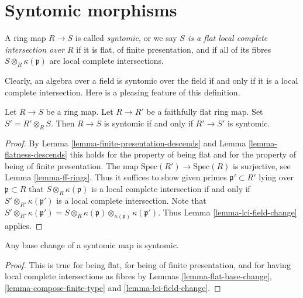 \section{Syntomic morphisms}
\label{section-syntomic}

\begin{definition}
\label{definition-lci}
A ring map $R \to S$ is called {\it syntomic}, or we say {\it $S$ is a
flat local complete intersection over $R$}
if it is flat, of finite presentation, and if all of its fibres
$S \otimes_R \kappa(\mathfrak p)$ are local complete intersections.
\end{definition}

\noindent
Clearly, an algebra over a field is syntomic over the field
if and only if it is a local complete intersection. Here is
a pleasing feature of this definition.

\begin{lemma}
\label{lemma-syntomic-descends}
Let $R \to S$ be a ring map.
Let $R \to R'$ be a faithfully flat ring map.
Set $S' = R'\otimes_R S$.
Then $R \to S$ is syntomic if and only if $R' \to S'$ is syntomic.
\end{lemma}

\begin{proof}
By Lemma \ref{lemma-finite-presentation-descends} and
Lemma \ref{lemma-flatness-descends} this holds for the property
of being flat and for the property of being of finite presentation.
The map $\text{Spec}(R') \to \text{Spec}(R)$ is surjective,
see Lemma \ref{lemma-ff-rings}. Thus it suffices to show
given primes $\mathfrak p' \subset R'$ lying over $\mathfrak p \subset R$
that $S \otimes_R \kappa(\mathfrak p)$ is a local complete 
intersection if and only if $S' \otimes_{R'} \kappa(\mathfrak p')$
is a local complete intersection. Note that
$S' \otimes_{R'} \kappa(\mathfrak p') =
S \otimes_R \kappa(\mathfrak p)
\otimes_{\kappa(\mathfrak p)} \kappa(\mathfrak p')$.
Thus Lemma \ref{lemma-lci-field-change} applies.
\end{proof}

\begin{lemma}
\label{lemma-base-change-syntomic}
Any base change of a syntomic map is syntomic.
\end{lemma}

\begin{proof}
This is true for being flat, for being of finite presentation,
and for having local complete intersections as fibres by
Lemmas \ref{lemma-flat-base-change}, \ref{lemma-compose-finite-type} and
\ref{lemma-lci-field-change}.
\end{proof}

